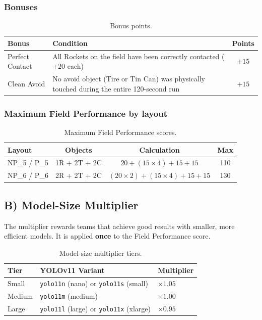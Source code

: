 \documentclass[a4]{article}
\begin{document}
\subsubsection*{Bonuses}

\begin{table}[H]
\centering
\begin{tabular}{p{4cm}p{7cm}c}
\toprule
\textbf{Bonus} & \textbf{Condition} & \textbf{Points} \\
\midrule
Perfect Contact & All Rockets on the field have been correctly contacted ($+20$ each) & $+15$ \\
Clean Avoid & No avoid object (Tire or Tin Can) was physically touched during the entire 120-second run & $+15$ \\
\bottomrule
\end{tabular}
\caption{Bonus points.}
\end{table}

\subsubsection*{Maximum Field Performance by layout}

\begin{table}[H]
\centering
\begin{tabular}{lccc}
\toprule
\textbf{Layout} & \textbf{Objects} & \textbf{Calculation} & \textbf{Max} \\
\midrule
NP\_5 / P\_5 & 1R + 2T + 2C & $20 + (15 \times 4) + 15 + 15$ & 110 \\
NP\_6 / P\_6 & 2R + 2T + 2C & $(20 \times 2) + (15 \times 4) + 15 + 15$ & 130 \\
\bottomrule
\end{tabular}
\caption{Maximum Field Performance scores.}
\end{table}

\subsection*{B) Model-Size Multiplier}

The multiplier rewards teams that achieve good results with smaller, more efficient models. It is applied \textbf{once} to the Field Performance score.

\begin{table}[H]
\centering
\begin{tabular}{lll}
\toprule
\textbf{Tier} & \textbf{YOLOv11 Variant} & \textbf{Multiplier} \\
\midrule
Small & \texttt{yolo11n} (nano) or \texttt{yolo11s} (small) & $\times 1.05$ \\
Medium & \texttt{yolo11m} (medium) & $\times 1.00$ \\
Large & \texttt{yolo11l} (large) or \texttt{yolo11x} (xlarge) & $\times 0.95$ \\
\bottomrule
\end{tabular}
\caption{Model-size multiplier tiers.}
\end{table}
\end{document}
